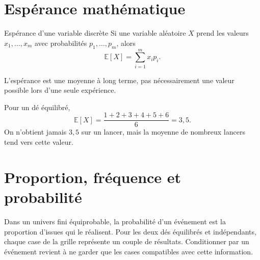 \section{Espérance mathématique}
\label{manual:section:08.06}

\begin{definition}{Espérance d'une variable discrète}{}
Si une variable aléatoire $X$ prend les valeurs $x_1,\ldots,x_m$ avec probabilités $p_1,\ldots,p_m$, alors
\[
\mathbb E[X]=\sum_{i=1}^m x_i p_i.
\]
\end{definition}

L'espérance est une moyenne à long terme, pas nécessairement une valeur possible lors d'une seule expérience.

\begin{examplebox}
Pour un dé équilibré,
\[
\mathbb E[X]=\frac{1+2+3+4+5+6}{6}=3{,}5.
\]
On n'obtient jamais $3{,}5$ sur un lancer, mais la moyenne de nombreux lancers tend vers cette valeur.
\end{examplebox}


\section{Proportion, fréquence et probabilité}
\label{manual:section:08.07}

\begin{visualbox}
Dans un univers fini équiprobable, la probabilité d'un événement est la proportion d'issues qui le réalisent. Pour les deux dés équilibrés et indépendants, chaque case de la grille représente un couple de résultats. Conditionner par un événement revient à ne garder que les cases compatibles avec cette information.
\end{visualbox}

\begin{center}
\end{center}

